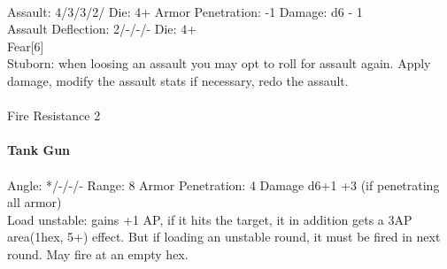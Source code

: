 \ \\
Assault: 4/3/3/2/ Die: 4+ Armor Penetration: -1 Damage: d6 - 1 \\
Assault Deflection: 2/-/-/- Die: 4+\\
\indent Fear[6]\\ Stuborn: when loosing an assault you may opt to roll for assault again. Apply damage, modify the assault stats if necessary, redo the assault. \\
\ \\
Fire Resistance 2
\ \\
\ \\
{\bf Tank Gun } \\
\ \\
Angle: */-/-/- Range: 8 Armor Penetration: 4 Damage d6+1 +3 (if penetrating all armor) \\
\indent Load unstable: gains +1 AP, if it hits the target, it in addition gets a 3AP area(1hex, 5+) effect. But if loading an unstable round, it must be fired in next round. May fire at an empty hex. \\





